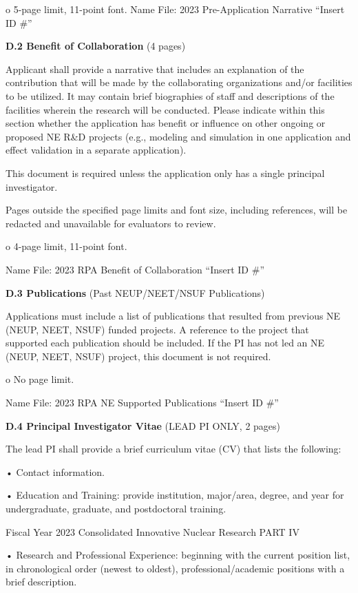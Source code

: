 o 5-page limit, 11-point font.  Name File: 2023 Pre-Application Narrative
“Insert ID \#”

{\bf D.2 Benefit of Collaboration} (4 pages)

Applicant shall provide a narrative that includes an explanation of the
contribution that will be made by the collaborating organizations and/or
facilities to be utilized. It may contain brief biographies of staff and
descriptions of the facilities wherein the research will be conducted. Please
indicate within this section whether the application has benefit or influence
on other ongoing or proposed NE R\&D projects (e.g., modeling and simulation in
one application and effect validation in a separate application).

This document is required unless the application only has a single principal
investigator.

Pages outside the specified page limits and font size, including references,
will be redacted and unavailable for evaluators to review.

o 4-page limit, 11-point font.

Name File: 2023 RPA Benefit of Collaboration “Insert ID \#”

{\bf D.3 Publications} (Past NEUP/NEET/NSUF Publications)

Applications must include a list of publications that resulted from previous NE
(NEUP, NEET, NSUF) funded projects. A reference to the project that supported
each publication should be included. If the PI has not led an NE (NEUP, NEET,
NSUF) project, this document is not required.

o No page limit.

Name File: 2023 RPA NE Supported Publications “Insert ID \#”

{\bf D.4 Principal Investigator Vitae} (LEAD PI ONLY, 2 pages)

The lead PI shall provide a brief curriculum vitae (CV) that lists the
following:

• Contact information.

• Education and Training: provide institution, major/area, degree, and year for
undergraduate, graduate, and postdoctoral training.

Fiscal Year 2023 Consolidated Innovative Nuclear Research PART IV

• Research and Professional Experience: beginning with the current position
list, in chronological order (newest to oldest), professional/academic
positions with a brief description.

